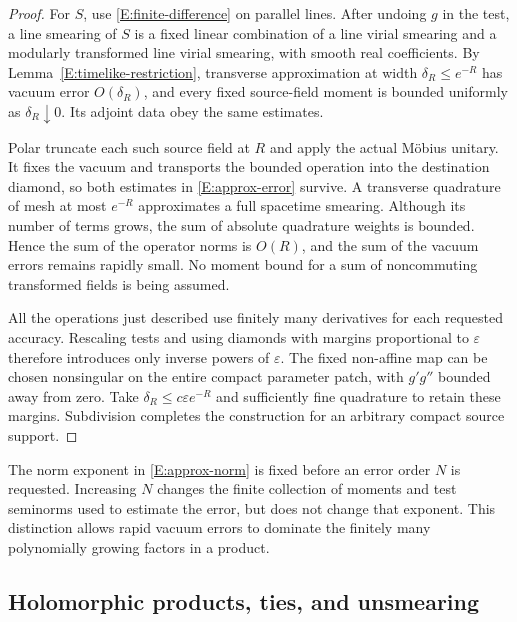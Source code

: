 \begin{proof}
For $S$, use \eqref{E:finite-difference} on parallel lines.  After
undoing $g$ in the test, a line smearing of $S$ is a fixed linear
combination of a line virial smearing and a modularly transformed
line virial smearing, with smooth real coefficients.  By
Lemma~\ref{E:timelike-restriction}, transverse approximation at width
$\delta_R\leq e^{-R}$ has vacuum error $O(\delta_R)$, and every
fixed source-field moment is bounded uniformly as
$\delta_R\downarrow0$.  Its adjoint data obey the same estimates.

Polar truncate each such source field at $R$ and apply the actual
M\"obius unitary.  It fixes the vacuum and transports the bounded
operation into the destination diamond, so both estimates in
\eqref{E:approx-error} survive.  A transverse quadrature of mesh
at most $e^{-R}$ approximates a full spacetime smearing.  Although
its number of terms grows, the sum of absolute quadrature weights
is bounded.  Hence the sum of the operator norms is $O(R)$, and the
sum of the vacuum errors remains rapidly small.  No moment bound
for a sum of noncommuting transformed fields is being assumed.

All the operations just described use finitely many derivatives for
each requested accuracy.  Rescaling tests and using diamonds with
margins proportional to $\varepsilon$ therefore introduces only
inverse powers of $\varepsilon$.  The fixed non-affine map can be
chosen nonsingular on the entire compact parameter patch, with
$g'g''$ bounded away from zero.  Take
$\delta_R\leq c\varepsilon e^{-R}$ and sufficiently fine quadrature
to retain these margins.  Subdivision completes the construction
for an arbitrary compact source support.
\end{proof}

The norm exponent in \eqref{E:approx-norm} is fixed before an error
order $N$ is requested.  Increasing $N$ changes the finite collection
of moments and test seminorms used to estimate the error, but does not
change that exponent.  This distinction allows rapid vacuum errors
to dominate the finitely many polynomially growing factors in a
product.

\subsection{Holomorphic products, ties, and unsmearing}

